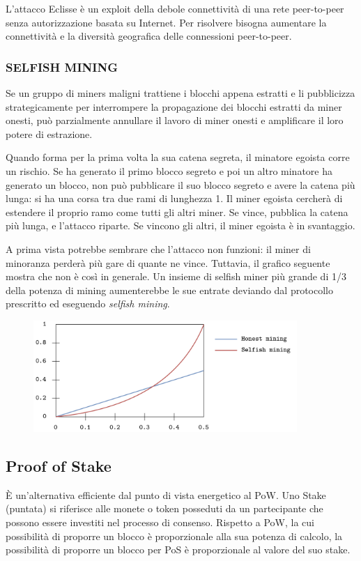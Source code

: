 L'attacco Eclisse è un exploit della debole connettività di una rete peer-to-peer senza autorizzazione basata su Internet. Per risolvere bisogna aumentare la connettività e la diversità geografica delle connessioni peer-to-peer.

\subsubsection{\textbf{SELFISH MINING}}
Se un gruppo di miners maligni trattiene i blocchi appena estratti e li pubblicizza strategicamente per interrompere la propagazione dei blocchi estratti da miner onesti, può parzialmente annullare il lavoro di miner onesti e amplificare il loro potere di estrazione.

Quando forma per la prima volta la sua catena segreta, il minatore egoista corre un rischio. Se ha generato il primo blocco segreto e poi un altro minatore ha generato un blocco, non può pubblicare il suo blocco segreto e avere la catena più lunga: si ha una corsa tra due rami di lunghezza 1. Il miner egoista cercherà di estendere il proprio ramo come tutti gli altri miner. Se vince, pubblica la catena più lunga, e l'attacco riparte. Se vincono gli altri, il miner egoista è in svantaggio.

A prima vista potrebbe sembrare che l'attacco non funzioni: il miner di minoranza perderà più gare di quante ne vince. Tuttavia, il grafico seguente mostra che non è così in generale. Un insieme di selfish miner più grande di 1/3 della potenza di mining aumenterebbe le sue entrate deviando dal protocollo prescritto ed eseguendo \textit{selfish mining}.

\begin{figure}[htb!]
    \centering
    \includegraphics[width=10cm]{./Images/cap3/3.10.png}
\end{figure}

\subsection{Proof of Stake}
È un'alternativa efficiente dal punto di vista energetico al PoW. Uno Stake (puntata) si riferisce alle monete o token posseduti da un partecipante che possono essere investiti nel processo di consenso. Rispetto a PoW, la cui possibilità di proporre un blocco è proporzionale alla sua potenza di calcolo, la possibilità di proporre un blocco per PoS è proporzionale al valore del suo stake.

